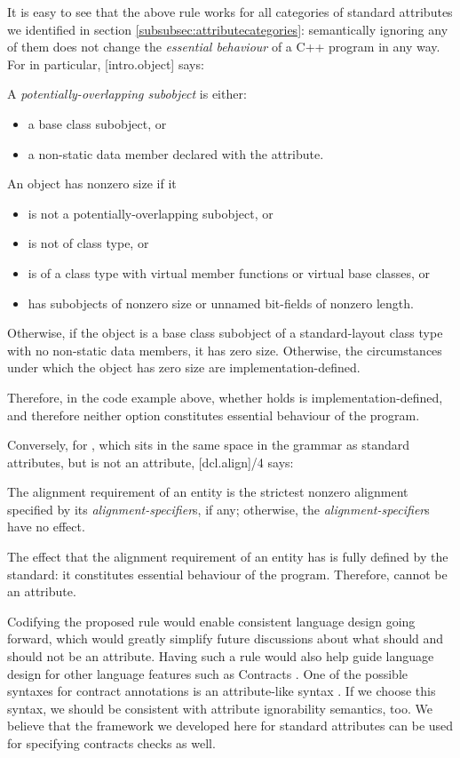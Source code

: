 It is easy to see that the above rule works for all categories of standard attributes we identified in section \ref{subsubsec:attributecategories}: semantically ignoring any of them does not change the \emph{essential behaviour} of a C++ program in any way. For  in particular, [intro.object] says:
\begin{adjustwidth}{0.5cm}{0.5cm}
A \emph{potentially-overlapping subobject} is either:
\begin{itemize}
\item a base class subobject, or
\item a non-static data member declared with the  attribute.
\end{itemize}
An object has nonzero size if it
\begin{itemize}
\item is not a potentially-overlapping subobject, or
\item is not of class type, or
\item is of a class type with virtual member functions or virtual base classes, or
\item has subobjects of nonzero size or unnamed bit-fields of nonzero length.
\end{itemize}
Otherwise, if the object is a base class subobject of a standard-layout class type with no non-static data members, it has zero size. Otherwise, the circumstances under which the object has zero size are implementation-defined. 
\end{adjustwidth}

Therefore, in the code example above, whether  holds is implementation-defined, and therefore neither option constitutes essential behaviour of the program.

Conversely, for , which sits in the same space in the grammar as standard attributes, but is not an attribute, [dcl.align]/4 says:
\begin{adjustwidth}{0.5cm}{0.5cm}
The alignment requirement of an entity is the strictest nonzero alignment specified by its \emph{alignment-specifier}s, if any; otherwise, the \emph{alignment-specifier}s have no effect.
\end{adjustwidth}
The effect that the alignment requirement of an entity has is fully defined by the standard: it constitutes essential behaviour of the program. Therefore,  cannot be an attribute.

Codifying the proposed rule would enable consistent language design going forward, which would greatly simplify future discussions about what should and should not be an attribute. Having such a rule would also help guide language design for other language features such as Contracts \cite{P2521R2}. One of the possible syntaxes for contract annotations is an attribute-like syntax \cite{P2487R0}. If we choose this syntax, we should be consistent with attribute ignorability semantics, too. We believe that the framework we developed here for standard attributes can be used for specifying contracts checks as well.

